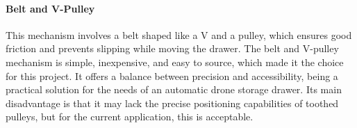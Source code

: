     \paragraph{Belt and V-Pulley} This mechanism involves a belt shaped like a V and a pulley, which ensures good friction and prevents slipping while moving the drawer. The belt and V-pulley mechanism is simple, inexpensive, and easy to source, which made it the choice for this project. It offers a balance between precision and accessibility, being a practical solution for the needs of an automatic drone storage drawer. Its main disadvantage is that it may lack the precise positioning capabilities of toothed pulleys, but for the current application, this is acceptable.

    

    
    